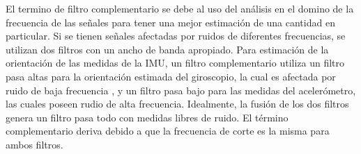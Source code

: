 El termino de filtro complementario se debe al uso del análisis en el domino de la frecuencia de las señales para tener una mejor estimación de una cantidad en particular. Si se tienen señales afectadas por  ruidos de diferentes frecuencias, se utilizan dos filtros con un ancho de banda apropiado. Para estimación de la orientación de las medidas de la IMU, un filtro complementario utiliza un filtro pasa altas para la orientación estimada del giroscopio, la cual es afectada por  ruido de baja frecuencia , y un filtro pasa bajo para las medidas del acelerómetro, las cuales poseen rudio de alta frecuencia. Idealmente, la fusión de los dos filtros genera un filtro pasa todo con medidas libres de ruido. El término complementario deriva debido a que la frecuencia de corte es la misma para ambos filtros. \\



